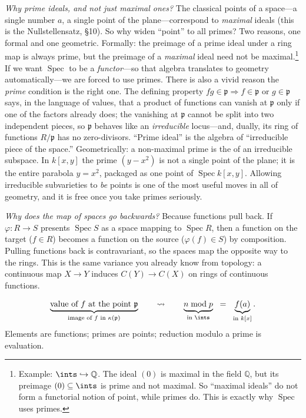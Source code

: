 \documentclass[11pt]{article}
\DeclareMathOperator{\Spec}{Spec}
\newcommand{\mfp}{\mathfrak{p}}
\begin{document}
\emph{Why prime ideals, and not just maximal ones?} The classical points of a space---a
single number $a$, a single point of the plane---correspond to \emph{maximal} ideals (this
is the Nullstellensatz, \S10). So why widen ``point'' to all primes? Two reasons, one formal
and one geometric. Formally: the preimage of a prime ideal under a ring map is always
prime, but the preimage of a \emph{maximal} ideal need not be maximal.\footnote{Example:
$\ints\hookrightarrow\mathbb{Q}$. The ideal $(0)$ is maximal in the field $\mathbb{Q}$, but
its preimage $(0)\subseteq\ints$ is prime and not maximal. So ``maximal ideals'' do not form
a functorial notion of point, while primes do. This is exactly why $\Spec$ uses primes.} If
we want $\Spec$ to be a \emph{functor}---so that algebra translates to geometry
automatically---we are forced to use primes. There is also a vivid reason the \emph{prime}
condition is the right one. The defining property $fg\in\mfp\Rightarrow f\in\mfp$ or
$g\in\mfp$ says, in the language of values, that a product of functions can vanish at $\mfp$
only if one of the factors already does; the vanishing at $\mfp$ cannot be split into two
independent pieces, so $\mfp$ behaves like an \emph{irreducible} locus---and, dually, its
ring of functions $R/\mfp$ has no zero-divisors. ``Prime ideal'' is the algebra of
``irreducible piece of the space.'' Geometrically: a non-maximal prime is the
 of an irreducible subspace. In $k[x,y]$ the prime $(y-x^2)$ is not a
single point of the plane; it is the entire parabola $y=x^2$, packaged as one point of
$\Spec k[x,y]$. Allowing irreducible subvarieties to \emph{be} points is one of the most
useful moves in all of geometry, and it is free once you take primes seriously.

\emph{Why does the map of spaces go backwards?} Because functions pull back. If
$\varphi\colon R\to S$ presents $\Spec S$ as a space mapping to $\Spec R$, then a function on
the target ($f\in R$) becomes a function on the source ($\varphi(f)\in S$) by composition.
Pulling functions back is contravariant, so the spaces map the opposite way to the rings.
This is the same variance you already know from topology: a continuous map $X\to Y$ induces
$C(Y)\to C(X)$ on rings of continuous functions.

\begin{eequation}
\[
\underbrace{\text{value of } f \text{ at the point } \mfp}_{\text{image of } f \text{ in } \kappa(\mfp)}
\qquad\rightsquigarrow\qquad
\underbrace{n \bmod p}_{\text{in } \ints}
\;\;=\;\;
\underbrace{f(a)}_{\text{in } k[x]}.
\]
Elements are functions; primes are points; reduction modulo a prime is evaluation.
\end{eequation}
\end{document}
